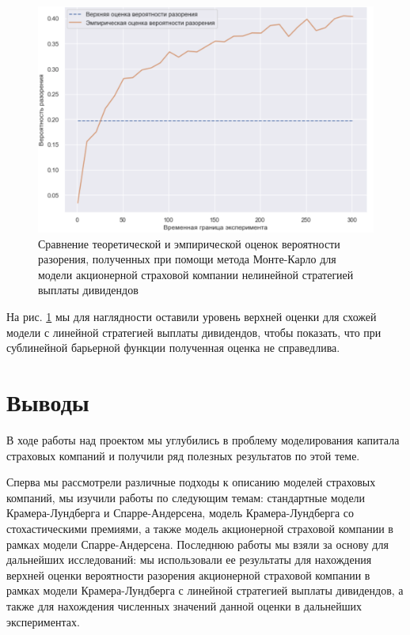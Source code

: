 \documentclass{article}
\theoremstyle{plain}
\theoremstyle{plain}
\theoremstyle{plain}
\theoremstyle{plain}
\theoremstyle{definition}
\theoremstyle{remark}
\begin{document}
\begin{figure}[h]
\centering
\includegraphics[scale=0.7]{images/non_linear_barrier_MC.png}
\captionsetup{justification=centering}
\caption{Сравнение теоретической и эмпирической оценок вероятности разорения, полученных при помощи метода Монте-Карло для модели акционерной страховой компании нелинейной стратегией выплаты дивидендов}
\label{nonlinear_MC}
\end{figure}

На рис. \ref{nonlinear_MC} мы для наглядности оставили уровень верхней оценки для схожей модели с линейной стратегией выплаты дивидендов, чтобы показать, что при сублинейной барьерной функции полученная оценка не справедлива.

\clearpage

\section{Выводы}

В ходе работы над проектом мы углубились в проблему моделирования капитала страховых компаний и получили ряд полезных результатов по этой теме.

Сперва мы рассмотрели различные подходы к описанию моделей страховых компаний, мы изучили работы по следующим темам: стандартные модели Крамера-Лундберга и Спарре-Андерсена, модель Крамера-Лундберга со стохастическими премиями, а также модель акционерной страховой компании в рамках модели Спарре-Андерсена. Последнюю работы мы взяли за основу для дальнейших исследований: мы использовали ее результаты для нахождения верхней оценки вероятности разорения акционерной страховой компании в рамках модели Крамера-Лундберга с линейной стратегией выплаты дивидендов, а также для нахождения численных значений данной оценки в дальнейших экспериментах.
\end{document}
